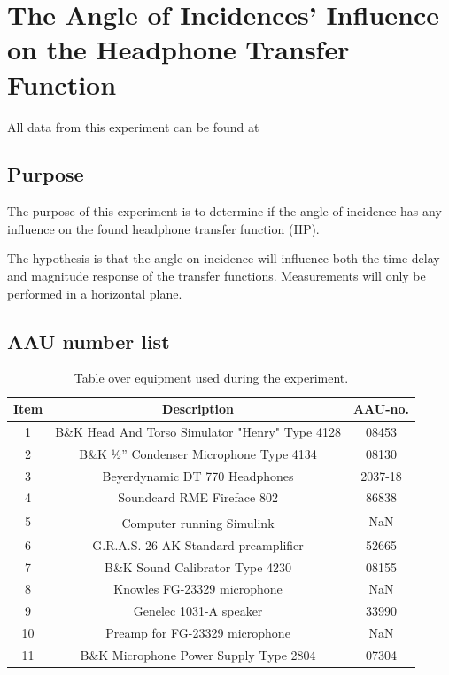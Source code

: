 
\section{The Angle of Incidences' Influence on the Headphone Transfer Function} \label{sec:AngleOfIncidence}

All data from this experiment can be found at

\subsection{Purpose}
The purpose of this experiment is to determine if the angle of incidence has any influence on the found headphone transfer function (HP). 

The hypothesis is that the angle on incidence will influence both the time delay and magnitude response of the transfer functions. Measurements will only be performed in a horizontal plane. 

\subsection{AAU number list}


\begin{table}[H]
	\centering
	\begin{tabular}{ c c c } \toprule
		{Item}	& {Description} 						& {AAU-no}. \\ \bottomrule 
		1	&	B\&K Head And Torso Simulator "Henry" Type 4128	& 08453	\\
		2	&	B\&K ½'' Condenser Microphone Type 4134 	& 08130		\\
		3	&	Beyerdynamic DT 770 Headphones				& 2037-18		\\
		4	&	Soundcard RME Fireface 802					& 86838		\\
		5	&	Computer running Simulink\textsuperscript{\textregistered}								& NaN		\\
		6	&	G.R.A.S. 26-AK Standard preamplifier		& 52665		\\
		7	&	B\&K Sound Calibrator Type 4230				& 08155		\\ 
		8	&	Knowles FG-23329 microphone					& NaN		\\
		9	&	Genelec 1031-A speaker								& 33990		\\ 
		10	&	Preamp for FG-23329  microphone	& NaN\\
		11	& 	B\&K Microphone Power Supply Type 2804		& 07304		\\
		\bottomrule
	\end{tabular}
	\caption{Table over equipment used during the experiment.}
	\label{tab:AngleOfIncideceHP}
\end{table}

